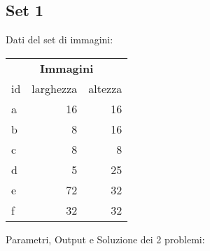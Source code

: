 
	\subsection{Set 1}
\iffalse
	Nel set sono presenti 6 immagini:
	\begin{itemize}
		\itemsep0em
		\item \texttt{a:\ 16x16};
		\item \texttt{b:\ \ 8x16};
		\item \texttt{c:\ \ 8x\ 8};
		\item \texttt{d:\ \ 5x25};
		\item \texttt{e:\ 72x32};
		\item \texttt{f:\ 32x32};
	\end{itemize}
\fi
%
Dati del set di immagini:  \\
%

\begin{table}[h!]
\centering
\footnotesize
\begin{tabular}{l|r|r}
\multicolumn{3}{c}{\textbf{Immagini}} \\ 
id & larghezza & altezza \\
\hline
a & 16 & 16 \\
		 b & 8&16\\
		 c & 8& 8\\
		 d & 5&25\\
		 e & 72&32\\
		 f & 32 &32\\
\end{tabular}
\end{table}
%


\noindent Parametri, Output e Soluzione dei 2 problemi: 

